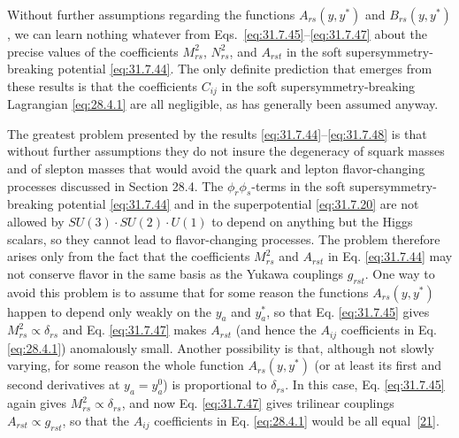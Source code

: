 Without further assumptions regarding the functions \(A_{rs}(y,y^*)\) and
\(B_{rs}(y,y^*)\), we can learn nothing whatever from
Eqs.~\eqref{eq:31.7.45}--\eqref{eq:31.7.47} about the precise values of the
coefficients \(M_{rs}^2\), \(N_{rs}^2\), and \(A_{rst}\) in the soft
supersymmetry-breaking potential \eqref{eq:31.7.44}. The only definite
prediction that emerges from these results is that the coefficients
\(C_{ij}\) in the soft supersymmetry-breaking Lagrangian \eqref{eq:28.4.1}
are all negligible, as has generally been assumed anyway.

The greatest problem presented by the results
\eqref{eq:31.7.44}--\eqref{eq:31.7.48} is that without further assumptions
they do not insure the degeneracy of squark masses and of slepton masses
that would avoid the quark and lepton flavor-changing processes discussed
in Section 28.4. The \(\phi_r\phi_s\)-terms in the soft
supersymmetry-breaking potential \eqref{eq:31.7.44} and in the
superpotential \eqref{eq:31.7.20} are not allowed by
\(SU(3)\cdot SU(2)\cdot U(1)\) to depend on anything but the Higgs scalars,
so they cannot lead to flavor-changing processes. The problem therefore
arises only from the fact that the coefficients \(M_{rs}^2\) and \(A_{rst}\)
in Eq. \eqref{eq:31.7.44} may not conserve flavor in the same basis as the
Yukawa couplings \(g_{rst}\). One way to avoid this problem is to assume
that for some reason the functions \(A_{rs}(y,y^*)\) happen to depend only
weakly on the \(y_a\) and \(y_a^*\), so that Eq. \eqref{eq:31.7.45} gives
\(M_{rs}^2\propto\delta_{rs}\) and Eq. \eqref{eq:31.7.47} makes \(A_{rst}\)
(and hence the \(A_{ij}\) coefficients in Eq. \eqref{eq:28.4.1})
anomalously small. Another possibility is that, although not slowly varying,
for some reason the whole function \(A_{rs}(y,y^*)\) (or at least its first
and second derivatives at \(y_a=y_a^0\)) is proportional to
\(\delta_{rs}\). In this case, Eq. \eqref{eq:31.7.45} again gives
\(M_{rs}^2\propto\delta_{rs}\), and now Eq. \eqref{eq:31.7.47} gives
trilinear couplings \(A_{rst}\propto g_{rst}\), so that the \(A_{ij}\)
coefficients in Eq. \eqref{eq:28.4.1} would be all
equal~\hyperref[ch31-ref-21]{[21]}.

